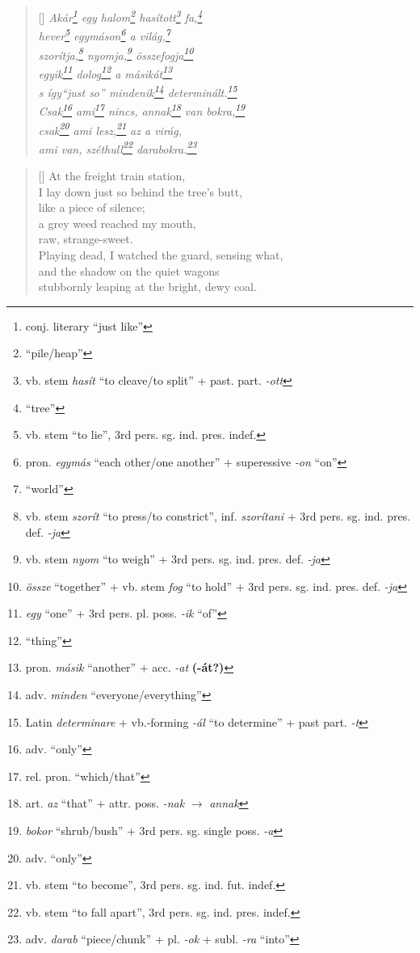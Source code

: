 \documentclass[a4paper,12pt,twoside,final]{book}
\begin{document}
\begin{verse}[\versewidth]
  \it
  Akár\footnote{conj. literary ``just like''} egy
  halom\footnote{``pile/heap''} hasított\footnote{vb. stem
  \emph{hasít} ``to cleave/to split'' +
  past. part. \emph{-ott} } fa,\footnote{``tree''} \\
  hever\footnote{vb. stem ``to lie'', 3rd pers. sg. ind. pres. indef.}
  egymáson\footnote{pron. \emph{egymás} ``each other/one
  another'' + superessive \emph{-on} ``on''} a világ,\footnote{``world''} \\
  szorítja,\footnote{vb. stem \emph{szorít} ``to press/to
  constrict'', inf. \emph{szorítani} + 3rd
  pers. sg. ind. pres. def. \emph{-ja}} nyomja,\footnote{vb. stem
  \emph{nyom} ``to weigh'' + 3rd pers. sg. ind. pres. def. \emph{-ja}}
  összefogja\footnote{\emph{össze} ``together'' + vb. stem \emph{fog}
  ``to hold'' + 3rd pers. sg. ind. pres. def. \emph{-ja}} \\
  egyik\footnote{\emph{egy} ``one'' + 3rd
  pers. pl. poss. \emph{-ik} ``of'' } dolog\footnote{``thing''} a
  másikát\footnote{pron. \emph{másik} ``another'' +
  acc. \emph{-at} \textbf{(-át?)}} \\
  s így\emph{``just so''} mindenik\footnote{adv. \emph{minden}
  ``everyone/everything''} determinált.\footnote{Latin \emph{determinare} +
  vb.-forming \emph{-ál} ``to determine'' + past part. \emph{-t}} \\
  Csak\footnote{adv. ``only''} ami\footnote{rel. pron. ``which/that''} nincs,
  annak\footnote{art. \emph{az} ``that'' + attr. poss. \emph{-nak}
  $\rightarrow$ \emph{annak}}
  van bokra,\footnote{\emph{bokor} ``shrub/bush'' + 3rd
  pers. sg. single poss. \emph{-a}} \\
  csak\footnote{adv. ``only''} ami lesz,\footnote{vb. stem ``to
  become'', 3rd pers. sg. ind. fut. indef.} az a virág, \\
  ami van, széthull\footnote{vb. stem ``to fall apart'',
  3rd pers. sg. ind. pres. indef.}
  darabokra.\footnote{adv. \emph{darab} ``piece/chunk'' +
  pl. \emph{-ok} + subl. \emph{-ra} ``into''}
\end{verse}

\newpage


\settowidth{\versewidth}{stubbornly leaping at the bright, dewy coal.}

\begin{verse}[\versewidth]
  At the freight train station, \\
  I lay down just so behind the tree's butt, \\
  like a piece of silence; \\
  a grey weed reached my mouth, \\
  raw, strange-sweet. \\
  Playing dead, I watched the guard, sensing what, \\
  and the shadow on the quiet wagons \\
  stubbornly leaping at the bright, dewy coal.
\end{verse}
\end{document}
